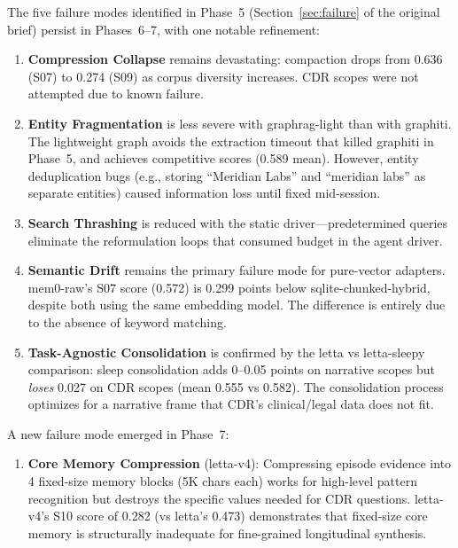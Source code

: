 \documentclass[11pt,letterpaper]{article}
\begin{document}
The five failure modes identified in Phase~5 (Section~\ref{sec:failure} of the original brief) persist in Phases~6--7, with one notable refinement:

\begin{enumerate}
  \item \textbf{Compression Collapse} remains devastating: compaction drops from 0.636 (S07) to 0.274 (S09) as corpus diversity increases. CDR scopes were not attempted due to known failure.

  \item \textbf{Entity Fragmentation} is less severe with graphrag-light than with graphiti. The lightweight graph avoids the extraction timeout that killed graphiti in Phase~5, and achieves competitive scores (0.589 mean). However, entity deduplication bugs (e.g., storing ``Meridian Labs'' and ``meridian labs'' as separate entities) caused information loss until fixed mid-session.

  \item \textbf{Search Thrashing} is reduced with the static driver---predetermined queries eliminate the reformulation loops that consumed budget in the agent driver.

  \item \textbf{Semantic Drift} remains the primary failure mode for pure-vector adapters. mem0-raw's S07 score (0.572) is 0.299 points below sqlite-chunked-hybrid, despite both using the same embedding model. The difference is entirely due to the absence of keyword matching.

  \item \textbf{Task-Agnostic Consolidation} is confirmed by the letta vs letta-sleepy comparison: sleep consolidation adds 0--0.05 points on narrative scopes but \emph{loses} 0.027 on CDR scopes (mean 0.555 vs 0.582). The consolidation process optimizes for a narrative frame that CDR's clinical/legal data does not fit.
\end{enumerate}

A new failure mode emerged in Phase~7:

\begin{enumerate}[resume]
  \item \textbf{Core Memory Compression} (letta-v4): Compressing episode evidence into 4 fixed-size memory blocks (5K chars each) works for high-level pattern recognition but destroys the specific values needed for CDR questions. letta-v4's S10 score of 0.282 (vs letta's 0.473) demonstrates that fixed-size core memory is structurally inadequate for fine-grained longitudinal synthesis.
\end{enumerate}
\end{document}
